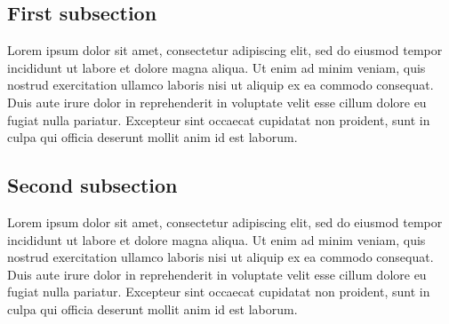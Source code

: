 \subsection{First subsection}

Lorem ipsum dolor sit amet, consectetur adipiscing elit, sed do eiusmod tempor incididunt ut labore et dolore magna aliqua. Ut enim ad minim veniam, quis nostrud exercitation ullamco laboris nisi ut aliquip ex ea commodo consequat. Duis aute irure dolor in reprehenderit in voluptate velit esse cillum dolore eu fugiat nulla pariatur. Excepteur sint occaecat cupidatat non proident, sunt in culpa qui officia deserunt mollit anim id est laborum.

\subsection{Second subsection}

Lorem ipsum dolor sit amet, consectetur adipiscing elit, sed do eiusmod tempor incididunt ut labore et dolore magna aliqua. Ut enim ad minim veniam, quis nostrud exercitation ullamco laboris nisi ut aliquip ex ea commodo consequat. Duis aute irure dolor in reprehenderit in voluptate velit esse cillum dolore eu fugiat nulla pariatur. Excepteur sint occaecat cupidatat non proident, sunt in culpa qui officia deserunt mollit anim id est laborum.

